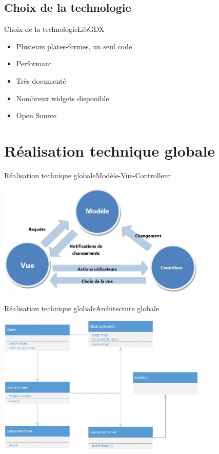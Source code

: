 \documentclass{beamer}
\begin{document}
\subsection{Choix de la technologie}

\begin{frame}{Choix de la technologie}{LibGDX}
  \begin{itemize}
  \item Plusieurs plates-formes, un seul code
	\item Performant
	\item Très documenté
	\item Nombreux widgets disponible
	\item Open Source
  \end{itemize}
\end{frame}

\section{Réalisation technique globale}

\begin{frame}{Réalisation technique globale}{Modèle-Vue-Controlleur}
 \begin{center}
\includegraphics[width=10cm]{mvc.jpg}
\end{center}

\end{frame}

\begin{frame}{Réalisation technique globale}{Architecture globale}
\begin{center}
\includegraphics[width=10cm]{uml.jpg}
\end{center}

\end{frame}
\end{document}
